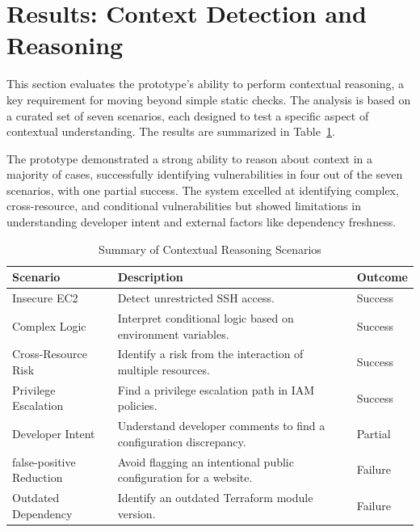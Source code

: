 \section{Results: Context Detection and Reasoning}\label{sec:results-context}

This section evaluates the prototype's ability to perform contextual reasoning, a key requirement for moving beyond simple static checks. The analysis is based on a curated set of seven scenarios, each designed to test a specific aspect of contextual understanding. The results are summarized in Table~\ref{tab:context-reasoning-summary}.

The prototype demonstrated a strong ability to reason about context in a majority of cases, successfully identifying vulnerabilities in four out of the seven scenarios, with one partial success. The system excelled at identifying complex, cross-resource, and conditional vulnerabilities but showed limitations in understanding developer intent and external factors like dependency freshness.

\begin{table}[htbp]
	\centering
	\caption{Summary of Contextual Reasoning Scenarios}\label{tab:context-reasoning-summary}
	\begin{tabular}{p{}p{}l}
		\hline
		\textbf{Scenario} & \textbf{Description} & \textbf{Outcome} \\
		\hline
		Insecure EC2 & Detect unrestricted SSH access. & Success \\
		Complex Logic & Interpret conditional logic based on environment variables. & Success \\
		Cross-Resource Risk & Identify a risk from the interaction of multiple resources. & Success \\
		Privilege Escalation & Find a privilege escalation path in IAM policies. & Success \\
		Developer Intent & Understand developer comments to find a configuration discrepancy. & Partial \\
		\gls{false-positive} Reduction & Avoid flagging an intentional public configuration for a website. & Failure \\
		Outdated Dependency & Identify an outdated Terraform module version. & Failure \\
		\hline
	\end{tabular}
\end{table}

